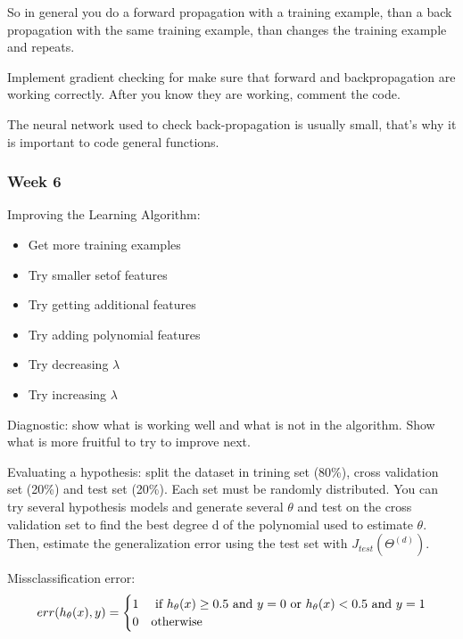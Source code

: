 \documentclass[12pt,a4paper]{report}
\begin{document}
	So in general you do a forward propagation with a training example, than a back propagation with the same training example, than changes the training example and repeats.
	
	Implement gradient checking for make sure that forward and backpropagation are working correctly. After you know they are working, comment the code.
	
	The neural network used to check back-propagation is usually small, that's why it is important to code general functions.
	
	\subsubsection{Week 6}
Improving the Learning Algorithm:

	
	
	\begin{itemize}
	\item Get more training examples
	\item Try smaller setof features
	\item Try getting additional features
	\item Try adding polynomial features
	\item Try decreasing $\lambda$
	\item Try increasing $\lambda$
	\end{itemize}
	
	Diagnostic: show what is working well and what is not in the algorithm. Show what is more fruitful to try to improve next.
	
	Evaluating a hypothesis: split the dataset in trining set (80\%), cross validation set (20\%) and test set (20\%). Each set must be randomly distributed. You can try several hypothesis models and generate several $\theta$ and test on the cross validation set to find the best degree d of the polynomial used to estimate $\theta$. Then, estimate the generalization error using the test set with $J_{test}(\Theta^{(d)})$.
	
	Missclassification error: 
\begin{equation}
	err(h_\theta(x),y) = 
	\begin{cases}
      1 & $ if $ h_\theta(x) \geq 0.5$ and $y=0$ or $h_\theta(x) < 0.5$ and $y = 1 \\
      0 & $otherwise$ 
   \end{cases}

\end{equation}	
\end{document}
